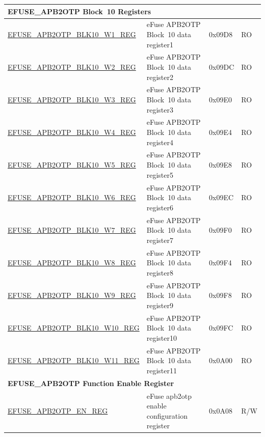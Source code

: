 \begin{longtable}{ | p{7cm} | p{6cm} | p{1.2cm} | p{1.5cm} | }
\multicolumn{4}{|l|}{\textbf{EFUSE\_APB2OTP Block~10 Registers}} \\ \hline
\hyperref[regdesc:EFUSEAPB2OTPBLK10WNREG]{EFUSE\_APB2OTP\_BLK10\_W1\_REG} & eFuse APB2OTP Block~10 data register1 & 0x09D8 & RO \\  \hline
\hyperref[regdesc:EFUSEAPB2OTPBLK10WNREG]{EFUSE\_APB2OTP\_BLK10\_W2\_REG} & eFuse APB2OTP Block~10 data register2 & 0x09DC & RO \\\hline
\hyperref[regdesc:EFUSEAPB2OTPBLK10WNREG]{EFUSE\_APB2OTP\_BLK10\_W3\_REG} & eFuse APB2OTP Block~10 data register3 & 0x09E0 & RO \\\hline
\hyperref[regdesc:EFUSEAPB2OTPBLK10WNREG]{EFUSE\_APB2OTP\_BLK10\_W4\_REG} & eFuse APB2OTP Block~10 data register4 & 0x09E4 & RO \\\hline
\hyperref[regdesc:EFUSEAPB2OTPBLK10WNREG]{EFUSE\_APB2OTP\_BLK10\_W5\_REG} & eFuse APB2OTP Block~10 data register5 & 0x09E8 & RO \\\hline
\hyperref[regdesc:EFUSEAPB2OTPBLK10WNREG]{EFUSE\_APB2OTP\_BLK10\_W6\_REG} & eFuse APB2OTP Block~10 data register6 & 0x09EC & RO \\\hline
\hyperref[regdesc:EFUSEAPB2OTPBLK10WNREG]{EFUSE\_APB2OTP\_BLK10\_W7\_REG} & eFuse APB2OTP Block~10 data register7 & 0x09F0 & RO \\\hline
\hyperref[regdesc:EFUSEAPB2OTPBLK10WNREG]{EFUSE\_APB2OTP\_BLK10\_W8\_REG} & eFuse APB2OTP Block~10 data register8 & 0x09F4 & RO \\\hline
\hyperref[regdesc:EFUSEAPB2OTPBLK10WNREG]{EFUSE\_APB2OTP\_BLK10\_W9\_REG} & eFuse APB2OTP Block~10 data register9 & 0x09F8 & RO \\\hline
\hyperref[regdesc:EFUSEAPB2OTPBLK10WNREG]{EFUSE\_APB2OTP\_BLK10\_W10\_REG} & eFuse APB2OTP Block~10 data register10 & 0x09FC & RO \\ \hline
\hyperref[regdesc:EFUSEAPB2OTPBLK10WNREG]{EFUSE\_APB2OTP\_BLK10\_W11\_REG} & eFuse APB2OTP Block~10 data register11 & 0x0A00 & RO \\\hline
\multicolumn{4}{|l|}{\textbf{EFUSE\_APB2OTP Function Enable Register}} \\ \hline
\hyperref[regdesc:EFUSEAPB2OTPENREG]{EFUSE\_APB2OTP\_EN\_REG} & eFuse apb2otp enable configuration register & 0x0A08 & R/W \\ \hline
\end{longtable}
